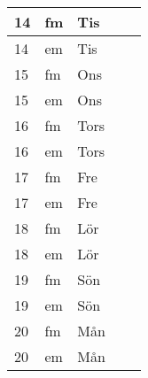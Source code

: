 \documentclass[a4paper]{article}
\begin{document}
\begin{table}[ht!]
\begin{tabular}{lllp{7cm}p{7cm}}
\multicolumn{1}{|l|}{14} & \multicolumn{1}{l|}{fm} & \multicolumn{1}{l|}{Tis} & \multicolumn{1}{l|}{} & \multicolumn{1}{l|}{} \\ \hline
\multicolumn{1}{|l|}{14} & \multicolumn{1}{l|}{em} & \multicolumn{1}{l|}{Tis} & \multicolumn{1}{l|}{} & \multicolumn{1}{l|}{} \\ \hline    

\multicolumn{1}{|l|}{15} & \multicolumn{1}{l|}{fm} & \multicolumn{1}{l|}{Ons} & \multicolumn{1}{l|}{} & \multicolumn{1}{l|}{} \\ \hline
\multicolumn{1}{|l|}{15} & \multicolumn{1}{l|}{em} & \multicolumn{1}{l|}{Ons} & \multicolumn{1}{l|}{} & \multicolumn{1}{l|}{} \\ \hline    

\multicolumn{1}{|l|}{16} & \multicolumn{1}{l|}{fm} & \multicolumn{1}{l|}{Tors} & \multicolumn{1}{l|}{} & \multicolumn{1}{l|}{} \\ \hline
\multicolumn{1}{|l|}{16} & \multicolumn{1}{l|}{em} & \multicolumn{1}{l|}{Tors} & \multicolumn{1}{l|}{} & \multicolumn{1}{l|}{} \\ \hline    

\multicolumn{1}{|l|}{17} & \multicolumn{1}{l|}{fm} & \multicolumn{1}{l|}{Fre} & \multicolumn{1}{l|}{} & \multicolumn{1}{l|}{} \\ \hline
\multicolumn{1}{|l|}{17} & \multicolumn{1}{l|}{em} & \multicolumn{1}{l|}{Fre} & \multicolumn{1}{l|}{} & \multicolumn{1}{l|}{} \\ \hline    

\multicolumn{1}{|l|}{18} & \multicolumn{1}{l|}{fm} & \multicolumn{1}{l|}{Lör} & \multicolumn{1}{l|}{} & \multicolumn{1}{l|}{} \\ \hline
\multicolumn{1}{|l|}{18} & \multicolumn{1}{l|}{em} & \multicolumn{1}{l|}{Lör} & \multicolumn{1}{l|}{} & \multicolumn{1}{l|}{} \\ \hline    

\multicolumn{1}{|l|}{19} & \multicolumn{1}{l|}{fm} & \multicolumn{1}{l|}{Sön} & \multicolumn{1}{l|}{} & \multicolumn{1}{l|}{} \\ \hline
\multicolumn{1}{|l|}{19} & \multicolumn{1}{l|}{em} & \multicolumn{1}{l|}{Sön} & \multicolumn{1}{l|}{} & \multicolumn{1}{l|}{} \\ \hline    

\multicolumn{1}{|l|}{20} & \multicolumn{1}{l|}{fm} & \multicolumn{1}{l|}{Mån} & \multicolumn{1}{l|}{} & \multicolumn{1}{l|}{} \\ \hline
\multicolumn{1}{|l|}{20} & \multicolumn{1}{l|}{em} & \multicolumn{1}{l|}{Mån} & \multicolumn{1}{l|}{} & \multicolumn{1}{l|}{} \\ \hline    


\end{tabular}
\end{table}
\end{document}
